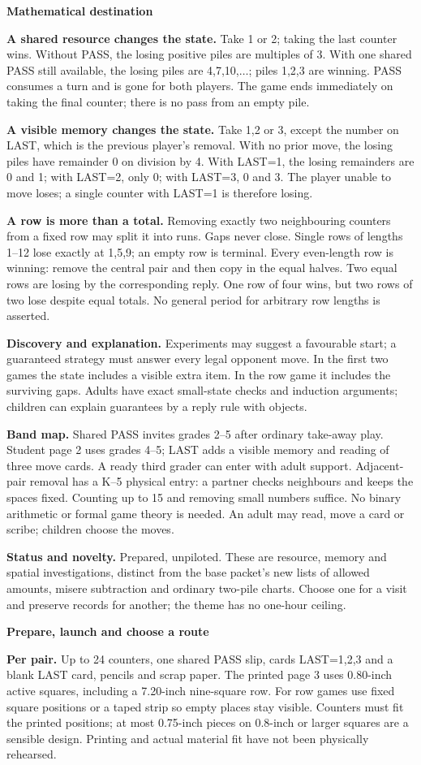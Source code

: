 \documentclass[11pt]{article}
\newcommand{\parttitle}[1]{{\large\bfseries\color{ink}#1}\par}
\newcommand{\labelled}[2]{\textbf{#1} #2\par}
\begin{document}
\parttitle{Mathematical destination}
\labelled{A shared resource changes the state.}{Take 1 or 2; taking the last counter wins. Without PASS, the losing positive piles are multiples of 3. With one shared PASS still available, the losing piles are 4,7,10,$\ldots$; piles 1,2,3 are winning. PASS consumes a turn and is gone for both players. The game ends immediately on taking the final counter; there is no pass from an empty pile.}
\labelled{A visible memory changes the state.}{Take 1,2 or 3, except the number on LAST, which is the previous player's removal. With no prior move, the losing piles have remainder 0 on division by 4. With LAST=1, the losing remainders are 0 and 1; with LAST=2, only 0; with LAST=3, 0 and 3. The player unable to move loses; a single counter with LAST=1 is therefore losing.}
\labelled{A row is more than a total.}{Removing exactly two neighbouring counters from a fixed row may split it into runs. Gaps never close. Single rows of lengths 1--12 lose exactly at 1,5,9; an empty row is terminal. Every even-length row is winning: remove the central pair and then copy in the equal halves. Two equal rows are losing by the corresponding reply. One row of four wins, but two rows of two lose despite equal totals. No general period for arbitrary row lengths is asserted.}
\labelled{Discovery and explanation.}{Experiments may suggest a favourable start; a guaranteed strategy must answer every legal opponent move. In the first two games the state includes a visible extra item. In the row game it includes the surviving gaps. Adults have exact small-state checks and induction arguments; children can explain guarantees by a reply rule with objects.}
\labelled{Band map.}{Shared PASS invites grades 2--5 after ordinary take-away play. Student page 2 uses grades 4--5; LAST adds a visible memory and reading of three move cards. A ready third grader can enter with adult support. Adjacent-pair removal has a K--5 physical entry: a partner checks neighbours and keeps the spaces fixed. Counting up to 15 and removing small numbers suffice. No binary arithmetic or formal game theory is needed. An adult may read, move a card or scribe; children choose the moves.}
\labelled{Status and novelty.}{Prepared, unpiloted. These are resource, memory and spatial investigations, distinct from the base packet's new lists of allowed amounts, misere subtraction and ordinary two-pile charts. Choose one for a visit and preserve records for another; the theme has no one-hour ceiling.}
\newpage
\parttitle{Prepare, launch and choose a route}
\labelled{Per pair.}{Up to 24 counters, one shared PASS slip, cards LAST=1,2,3 and a blank LAST card, pencils and scrap paper. The printed page 3 uses 0.80-inch active squares, including a 7.20-inch nine-square row. For row games use fixed square positions or a taped strip so empty places stay visible. Counters must fit the printed positions; at most 0.75-inch pieces on 0.8-inch or larger squares are a sensible design. Printing and actual material fit have not been physically rehearsed.}
\end{document}
